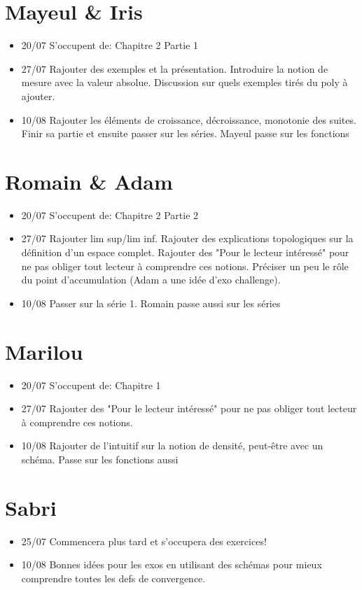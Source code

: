 \documentclass[a4paper, 12pt, french, twoside]{article}
\begin{document}
\section{Mayeul \& Iris}
\begin{itemize}
    \item 20/07 S'occupent de: Chapitre 2 Partie 1 
    \item 27/07 Rajouter des exemples et la présentation. Introduire la notion de mesure avec la valeur absolue. Discussion sur quels exemples tirés du poly à ajouter.
    
    \item 10/08 Rajouter les éléments de croissance, décroissance, monotonie des suites. Finir sa partie et ensuite passer sur les séries. Mayeul passe sur les fonctions
\end{itemize}


\section{Romain \& Adam}
\begin{itemize}
    \item 20/07 S'occupent de: Chapitre 2 Partie 2
    \item 27/07 Rajouter lim sup/lim inf. Rajouter des explications topologiques sur la définition d'un espace complet. Rajouter des "Pour le lecteur intéressé" pour ne pas obliger tout lecteur à comprendre ces notions. Préciser un peu le rôle du point d'accumulation (Adam a une idée d'exo challenge).
    
    \item 10/08 Passer sur la série 1. Romain passe aussi sur les séries
\end{itemize}


\section{Marilou}
\begin{itemize}
    \item 20/07 S'occupent de: Chapitre 1
    \item 27/07 Rajouter des "Pour le lecteur intéressé" pour ne pas obliger tout lecteur à comprendre ces notions. 
    
    \item 10/08 Rajouter de l'intuitif sur la notion de densité, peut-être avec un schéma. Passe sur les fonctions aussi
\end{itemize}


\section{Sabri}
\begin{itemize}
    \item 25/07 Commencera plus tard et s'occupera des exercices!
    
    \item 10/08 Bonnes idées pour les exos en utilisant des schémas pour mieux comprendre toutes les defs de convergence.
\end{itemize}
\end{document}
